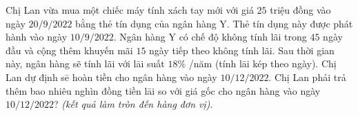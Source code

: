 \begin{ex}%
Chị Lan vừa mua một chiếc máy tính xách tay mới với giá $25$ triệu đồng vào ngày $20/9/2022$ bằng thẻ tín dụng của ngân hàng Y. Thẻ tín dụng này được phát hành vào ngày $10/9/2022$. Ngân hàng Y có chế độ không tính lãi trong $45$ ngày đầu và cộng thêm khuyến mãi $15$ ngày tiếp theo không tính lãi. Sau thời gian này, ngân hàng sẽ tính lãi với lāi suất $18\%$ /năm (tính lāi kép theo ngày). Chị Lan dự định sē hoàn tiền cho ngân hàng vào ngày $10/12/2022$. Chị Lan phải trả thêm bao nhiêu nghìn đồng tiền lāi so với giá gốc cho ngân hàng vào ngày $10/12/2022$? \textit{(kết quả làm tròn đến hàng đơn vị)}.
\end{ex}

